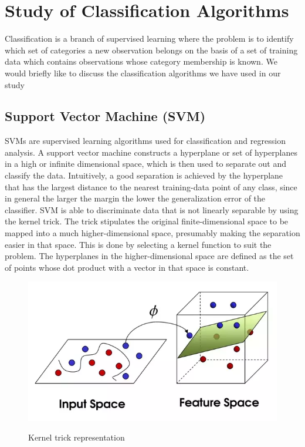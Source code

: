 \chapter{Study of Classification Algorithms} \label{Study of Classification Algorithms}
\noindent Classification is a branch of supervised learning where the problem is to identify which set of categories a new observation belongs on the basis of a set of training data which contains observations whose category membership is known. We would briefly like to discuss the classification algorithms we have used in our study


\section{ Support Vector Machine (SVM)} \label{ Support Vector Machine (SVM)}
\noindent SVMs are supervised learning algorithms used for classification and regression analysis. A support vector machine constructs a hyperplane or set of hyperplanes in a high or infinite dimensional space, which is then used to separate out and classify the data. Intuitively, a good separation is achieved by the hyperplane that has the largest distance to the nearest training-data point of any class, since in general the larger the margin the lower the generalization error of the classifier. SVM is able to discriminate data that is not linearly separable by using the kernel trick. 
\noindent The trick stipulates the original finite-dimensional space to be mapped into a much higher-dimensional space, presumably making the separation easier in that space. This is done by selecting a kernel function to suit the problem. The hyperplanes in the higher-dimensional space are defined as the set of points whose dot product with a vector in that space is constant.

\begin{figure}[H]
\centering
{\includegraphics[scale=0.74]{ktr.png}}
\caption{Kernel trick representation}
\end{figure}



